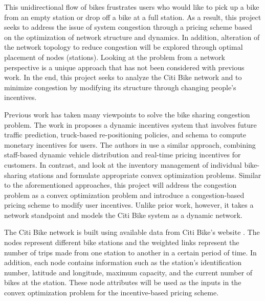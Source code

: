 \documentclass[times, 10pt,twocolumn]{article}
\begin{document}
This unidirectional flow of bikes frustrates users who would like to pick up a bike from an empty station or drop off a bike at a full station. As a result, this project seeks to address the issue of system congestion through a pricing scheme based on the optimization of network structure and dynamics. In addition, alteration of the network topology to reduce congestion will be explored through optimal placement of nodes (stations). Looking at the problem from a network perspective is a unique approach that has not been considered with previous work. In the end, this project seeks to analyze the Citi Bike network and to minimize congestion by modifying its structure through changing people's incentives.


Previous work has taken many viewpoints to solve the bike sharing congestion problem. The work in \cite{incentives} proposes a dynamic incentives system that involves future traffic prediction, truck-based re-positioning policies, and schema to compute monetary incentives for users. The authors in \cite{redistribution} use a similar approach, combining staff-based dynamic vehicle distribution and real-time pricing incentives for customers. In contrast, \cite{management} and \cite{redistribution} look at the inventory management of individual bike-sharing stations and formulate appropriate convex optimization problems. Similar to the aforementioned approaches, this project will address the congestion problem as a convex optimization problem and introduce a congestion-based pricing scheme to modify user incentives. Unlike prior work, however, it takes a network standpoint and models the Citi Bike system as a dynamic network.


The Citi Bike network is built using available data from Citi Bike's website \cite{dataset}. The nodes represent different bike stations and the weighted links represent the number of trips made from one station to another in a certain period of time. In addition, each node contains information such as the station's identification number, latitude and longitude, maximum capacity, and the current number of bikes at the station. These node attributes will be used as the inputs in the convex optimization problem for the incentive-based pricing scheme.
\end{document}
